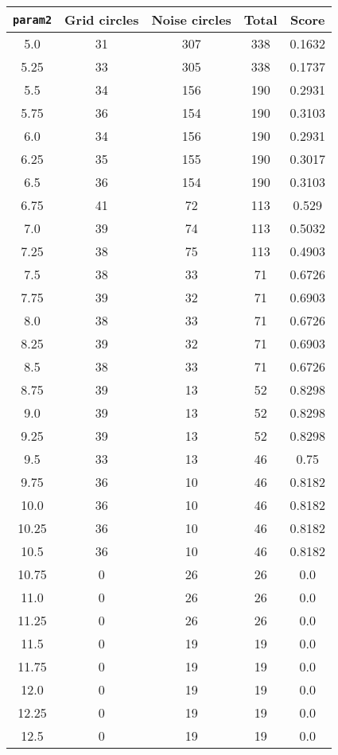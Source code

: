 \documentclass[letterpaper, 12pt]{article}
\begin{document}
\begin{longtable}{|c|c|c|c|c|}
\hline
\textbf{\texttt{param2}} & \textbf{Grid circles} & \textbf{Noise circles} & \textbf{Total} & \textbf{Score} \\
\hline
5.0 & 31 & 307 & 338 & 0.1632 \\
\hline
5.25 & 33 & 305 & 338 & 0.1737 \\
\hline
5.5 & 34 & 156 & 190 & 0.2931 \\
\hline
5.75 & 36 & 154 & 190 & 0.3103 \\
\hline
6.0 & 34 & 156 & 190 & 0.2931 \\
\hline
6.25 & 35 & 155 & 190 & 0.3017 \\
\hline
6.5 & 36 & 154 & 190 & 0.3103 \\
\hline
6.75 & 41 & 72 & 113 & 0.529 \\
\hline
7.0 & 39 & 74 & 113 & 0.5032 \\
\hline
7.25 & 38 & 75 & 113 & 0.4903 \\
\hline
7.5 & 38 & 33 & 71 & 0.6726 \\
\hline
7.75 & 39 & 32 & 71 & 0.6903 \\
\hline
8.0 & 38 & 33 & 71 & 0.6726 \\
\hline
8.25 & 39 & 32 & 71 & 0.6903 \\
\hline
8.5 & 38 & 33 & 71 & 0.6726 \\
\hline
8.75 & 39 & 13 & 52 & 0.8298 \\
\hline
9.0 & 39 & 13 & 52 & 0.8298 \\
\hline
9.25 & 39 & 13 & 52 & 0.8298 \\
\hline
9.5 & 33 & 13 & 46 & 0.75 \\
\hline
9.75 & 36 & 10 & 46 & 0.8182 \\
\hline
10.0 & 36 & 10 & 46 & 0.8182 \\
\hline
10.25 & 36 & 10 & 46 & 0.8182 \\
\hline
10.5 & 36 & 10 & 46 & 0.8182 \\
\hline
10.75 & 0 & 26 & 26 & 0.0 \\
\hline
11.0 & 0 & 26 & 26 & 0.0 \\
\hline
11.25 & 0 & 26 & 26 & 0.0 \\
\hline
11.5 & 0 & 19 & 19 & 0.0 \\
\hline
11.75 & 0 & 19 & 19 & 0.0 \\
\hline
12.0 & 0 & 19 & 19 & 0.0 \\
\hline
12.25 & 0 & 19 & 19 & 0.0 \\
\hline
12.5 & 0 & 19 & 19 & 0.0 \\

\end{longtable}
\end{document}
